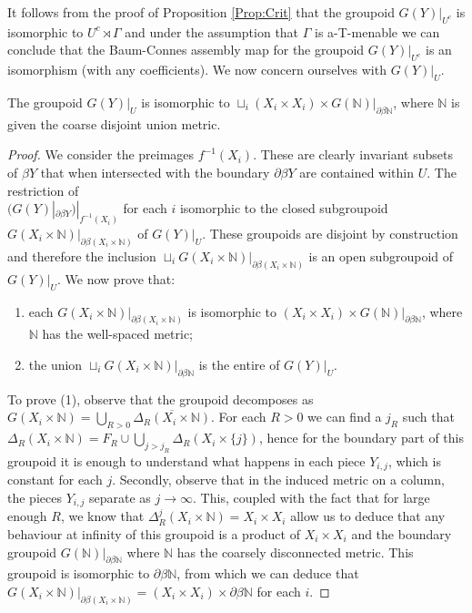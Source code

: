 \begin{example}
It follows from the proof of Proposition \ref{Prop:Crit} that the groupoid $G(Y)|_{U^{c}}$ is isomorphic to $U^{c}\rtimes \Gamma$ and under the assumption that $\Gamma$ is a-T-menable we can conclude that the Baum-Connes assembly map for the groupoid $G(Y)|_{U^{c}}$ is an isomorphism (with any coefficients). We now concern ourselves with $G(Y)|_{U}$.

\begin{lemma}\label{Lem:CE3}
The groupoid $G(Y)|_{U}$ is isomorphic to $\sqcup_{i}(X_{i}\times X_{i})\times G(\mathbb{N})|_{\partial\beta \mathbb{N}}$, where $\mathbb{N}$ is given the coarse disjoint union metric.
\end{lemma}
\begin{proof}
We consider the preimages $f^{-1}(X_{i})$. These are clearly invariant subsets of $\beta Y$ that when intersected with the boundary $\partial\beta Y$ are contained within $U$. The restriction of \\$(G(Y)|_{\partial\beta Y})|_{f^{-1}(X_{i})}$ for each $i$ isomorphic to the closed subgroupoid $G(X_{i}\times \mathbb{N})|_{\partial\beta(X_{i}\times \mathbb{N})}$ of $G(Y)|_{U}$. These groupoids are disjoint by construction and therefore the inclusion $\sqcup_{i}G(X_{i}\times \mathbb{N})|_{\partial\beta(X_{i}\times \mathbb{N})}$ is an open subgroupoid of $G(Y)|_{U}$. We now prove that:
\begin{enumerate}
\item each $G(X_{i} \times \mathbb{N})|_{\partial\beta(X_{i}\times \mathbb{N})}$ is isomorphic to $(X_{i}\times X_{i})\times G(\mathbb{N})|_{\partial\beta \mathbb{N}}$, where $\mathbb{N}$ has the well-spaced metric;
\item the union $\sqcup_{i}G(X_{i}\times \mathbb{N})|_{\partial\beta \mathbb{N}}$ is the entire of $G(Y)|_{U}$.
\end{enumerate}
To prove (1), observe that the groupoid decomposes as $G(X_{i}\times \mathbb{N}) = \bigcup_{R>0}\overline{\Delta_{R}(X_{i}\times \mathbb{N})}$. For each $R>0$ we can find a $j_{R}$ such that $\Delta_{R}(X_{i}\times \mathbb{N}) = F_{R} \cup \bigcup_{j>j_{R}}\Delta_{R}(X_{i}\times \lbrace j \rbrace)$, hence for the boundary part of this groupoid it is enough to understand what happens in each piece $Y_{i,j}$, which is constant for each $j$. Secondly, observe that in the induced metric on a column, the pieces $Y_{i,j}$ separate as $j\rightarrow \infty$. This, coupled with the fact that for large enough $R$, we know that $ \Delta^{j}_{R}(X_{i}\times \mathbb{N}) = X_{i} \times X_{i}$ allow us to deduce that any behaviour at infinity of this groupoid is a product of $X_{i} \times X_{i}$ and the boundary groupoid $G(\mathbb{N})|_{\partial\beta \mathbb{N}}$ where $\mathbb{N}$ has the coarsely disconnected metric. This groupoid is isomorphic to $\partial\beta \mathbb{N}$, from which we can deduce that $G(X_{i}\times \mathbb{N})|_{\partial\beta(X_{i}\times \mathbb{N})} = (X_{i}\times X_{i})\times \partial\beta \mathbb{N}$ for each $i$.


\end{proof}
\end{example}
